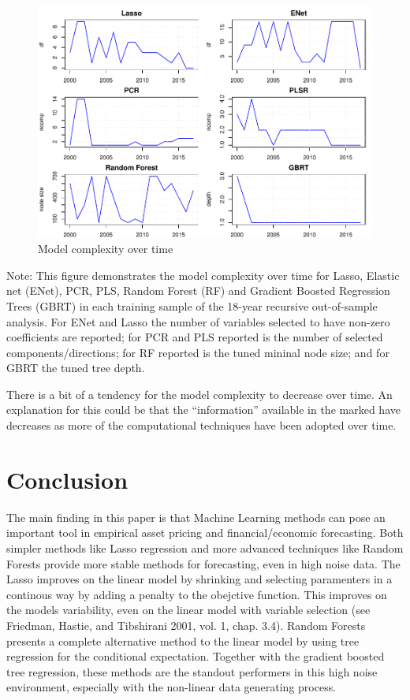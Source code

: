 \documentclass[]{article}
\begin{document}
\begin{figure}
\includegraphics[width=0.75\linewidth]{mark_files/figure-latex/complexity_plots-1} \caption{Model complexity over time}\label{fig:complexity_plots}
\end{figure}

Note: This figure demonstrates the model complexity over time for Lasso,
Elastic net (ENet), PCR, PLS, Random Forest (RF) and Gradient Boosted
Regression Trees (GBRT) in each training sample of the 18-year recursive
out-of-sample analysis. For ENet and Lasso the number of variables
selected to have non-zero coefficients are reported; for PCR and PLS
reported is the number of selected components/directions; for RF
reported is the tuned mininal node size; and for GBRT the tuned tree
depth.

There is a bit of a tendency for the model complexity to decrease over
time. An explanation for this could be that the ``information''
available in the marked have decreases as more of the computational
techniques have been adopted over time.

\hypertarget{conclusion}{%
\section{Conclusion}\label{conclusion}}

The main finding in this paper is that Machine Learning methods can pose
an important tool in empirical asset pricing and financial/economic
forecasting. Both simpler methods like Lasso regression and more
advanced techniques like Random Forests provide more stable methods for
forecasting, even in high noise data. The Lasso improves on the linear
model by shrinking and selecting paramenters in a continous way by
adding a penalty to the obejctive function. This improves on the models
variability, even on the linear model with variable selection (see
Friedman, Hastie, and Tibshirani 2001, vol. 1, chap. 3.4). Random
Forests presents a complete alternative method to the linear model by
using tree regression for the conditional expectation. Together with the
gradient boosted tree regression, these methods are the standout
performers in this high noise environment, especially with the
non-linear data generating process.
\end{document}

